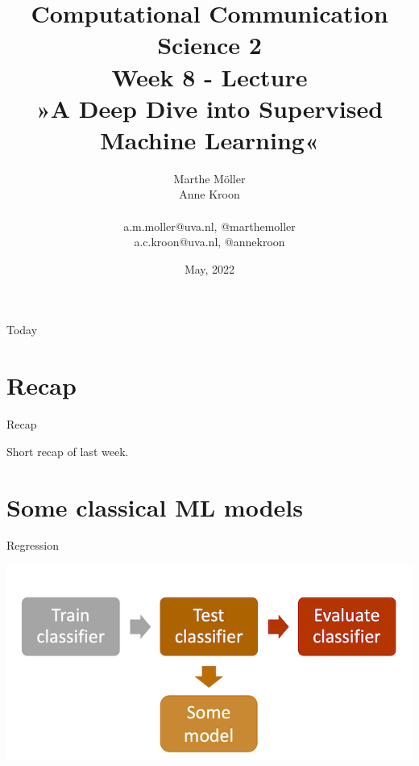\documentclass[handout]{beamer}
\title[Computational Communication Science 2]{\textbf{Computational Communication Science 2} \\Week 8 - Lecture\\ »A Deep Dive into Supervised Machine Learning«}
\author[Marthe Möller, Anne Kroon]{Marthe Möller \\ Anne Kroon \\ ~ \\ \footnotesize{a.m.moller@uva.nl, @marthemoller \\a.c.kroon@uva.nl, @annekroon} \\}
\date{May, 2022}
\institute[Digital Society Minor, University of Amsterdam]{Digital Society Minor, University of Amsterdam}
\begin{document}
	
	\begin{frame}{}
		\titlepage
\end{frame}
	
\begin{frame}{Today}
		\tableofcontents
\end{frame}


\section{Recap}

\begin{frame}{Recap}
	
	Short recap of last week.

	
\end{frame}



\section{Some classical ML models}

\begin{frame}{Regression}
	
	\begin{center}
		\includegraphics[width=\linewidth,height=\textheight,keepaspectratio]{../pictures/MLprocess_model.png} \\\
	\end{center}
	
	
	
\end{frame}
\end{document}
